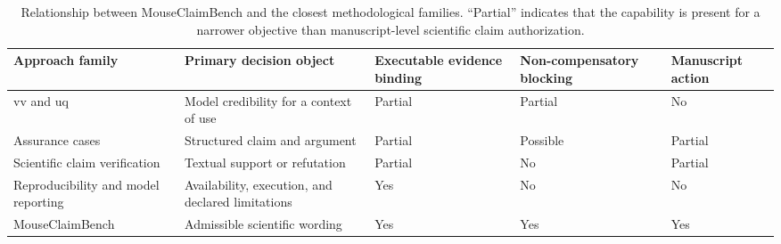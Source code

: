 \begin{table}[t!]
\centering
\caption{Relationship between MouseClaimBench and the closest methodological families. ``Partial'' indicates that the capability is present for a narrower objective than manuscript-level scientific claim authorization.}
\label{tab:related-work-comparison}
\small
\renewcommand{\arraystretch}{1.18}
\begin{tabularx}{\textwidth}{@{}p{}p{}p{}p{}Y@{}}
\toprule
Approach family & Primary decision object & Executable evidence binding & Non-compensatory blocking & Manuscript action \\
\midrule
\ac{vv} and \ac{uq} & Model credibility for a context of use & Partial & Partial & No \\
Assurance cases & Structured claim and argument & Partial & Possible & Partial \\
Scientific claim verification & Textual support or refutation & Partial & No & Partial \\
Reproducibility and model reporting & Availability, execution, and declared limitations & Yes & No & No \\
MouseClaimBench & Admissible scientific wording & Yes & Yes & Yes \\
\bottomrule
\end{tabularx}
\end{table}
